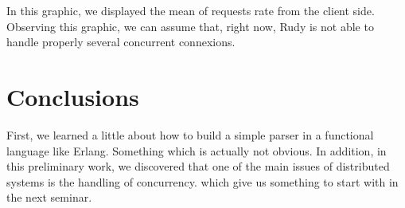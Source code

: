 \documentclass[a4paper, 11pt]{article}
\begin{document}
In this graphic, we displayed the mean of requests rate from the client side. 
Observing this graphic, we can assume that, right now, Rudy is not able to handle properly several concurrent connexions. 

\section{Conclusions}
 
First, we learned a little about how to build a simple parser in a functional language like Erlang. Something which is actually not obvious.
In addition, in this preliminary work, we discovered that one of the main issues of distributed systems is the handling of concurrency. which give us something to start with in the next seminar.
\end{document}
